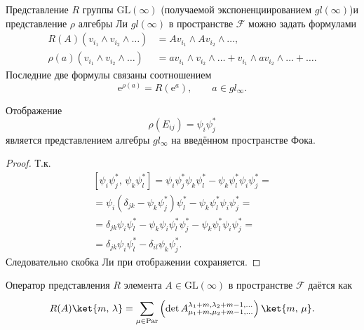 \documentclass[a4paper,14pt]{extarticle}
\numberwithin{equation}{section}
\begin{document}
Представление $R$ группы $\mathrm{GL}(\infty)$ (получаемой 
экспоненциированием $gl(\infty)$)и представление
$\rho$ алгебры Ли $gl(\infty)$ в пространстве $\mathcal{F}$ можно задать формулами
\begin{align}
	R\left( A \right) \left(  v_{i_1} \wedge 
	 v_{i_2} \wedge \ldots\right) &=
	A  v_{i_1} \wedge A  v_{i_2}\wedge 
	\ldots,
	\label{eq:GLr}\\
	\rho(a)\left(  v_{i_1} \wedge  v_{i_2}\wedge 
\ldots\right) &=a  v_{i_1} \wedge  v_{i_2}
	\wedge \ldots+  v_{i_1} \wedge 
	a  v_{i_2}\wedge \ldots+\ldots
.\end{align} 
Последние две формулы связаны соотношением
\begin{equation}
	\mathrm{e} ^{\rho(a)}=R\left( \mathrm{e} ^{a} \right) ,\qquad a \in gl_{\infty}
.\end{equation} 
\begin{stm*}
Отображение
\begin{equation}
	\rho(E_{ij})=\psi_i \psi_j^{*}
	\label{eq:2283}
\end{equation} 
является представлением алгебры $gl_\infty$
на введённом пространстве Фока.
\end{stm*}
\begin{proof}
Т.\:к.
\begin{multline}
	\left[ \psi_i \psi^*_j,\,\psi_k \psi^*_l \right] 
	=\psi_i \psi_j^* \psi_k \psi^*_l -\psi_k \psi^*_l
	\psi_i \psi^*_j=\\=\psi_i \left( \delta_{jk} -\psi_k \psi_j^* \right) \psi^*_l-\psi_k \psi_l^* \psi_i \psi^*_j=\\=\delta_{jk}\psi_i \psi^*_l-\psi_k \psi_i  \psi_l^*
	\psi_j^*-\psi_k \psi_l^* \psi_i \psi_j^*=\\=
	\delta_{jk} \psi_i \psi_{l}^*-
	\delta_{il}\psi_k \psi_j^*
.\end{multline}
Следовательно скобка Ли при отображении сохраняется.
\end{proof}

\begin{stm*}
Оператор представления $R$ элемента $A \in \mathrm{GL}(\infty)$ в пространстве $\mathcal{F}$
даётся как
\begin{equation}
	R(A) \ket{m,\,\lambda} =\sum_{\mu \in \mathrm{Par}}^{} \left( 
	\det A_{\mu_1+m,\mu_2+m-1,\ldots}^{\lambda_1+m,\lambda_2+m-1,\ldots}\right) \ket{m,\,\mu}.\end{equation}
\end{stm*}
\end{document}

